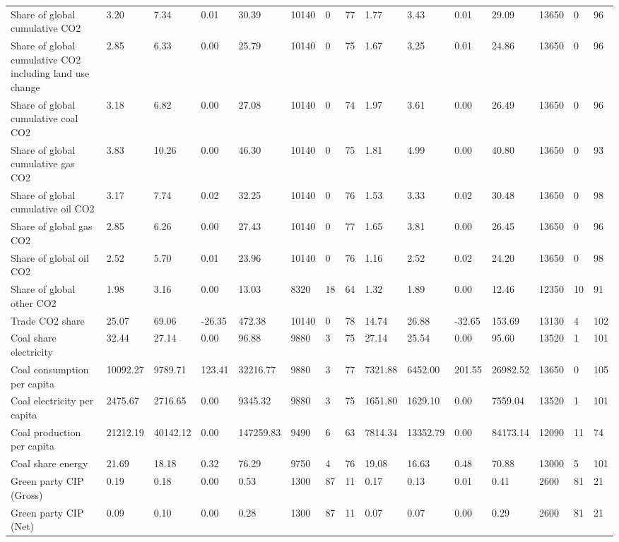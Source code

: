 \begin{longtable}{lllllllllllllll}
Share of global cumulative CO2 & 3.20 & 7.34 & 0.01 & 30.39 & 10140 & 0 & 77 & 1.77 & 3.43 & 0.01 & 29.09 & 13650 & 0 & 96\\
Share of global cumulative CO2 including land use change & 2.85 & 6.33 & 0.00 & 25.79 & 10140 & 0 & 75 & 1.67 & 3.25 & 0.01 & 24.86 & 13650 & 0 & 96\\
Share of global cumulative coal CO2 & 3.18 & 6.82 & 0.00 & 27.08 & 10140 & 0 & 74 & 1.97 & 3.61 & 0.00 & 26.49 & 13650 & 0 & 96\\
Share of global cumulative gas CO2 & 3.83 & 10.26 & 0.00 & 46.30 & 10140 & 0 & 75 & 1.81 & 4.99 & 0.00 & 40.80 & 13650 & 0 & 93\\
\addlinespace
Share of global cumulative oil CO2 & 3.17 & 7.74 & 0.02 & 32.25 & 10140 & 0 & 76 & 1.53 & 3.33 & 0.02 & 30.48 & 13650 & 0 & 98\\
Share of global gas CO2 & 2.85 & 6.26 & 0.00 & 27.43 & 10140 & 0 & 77 & 1.65 & 3.81 & 0.00 & 26.45 & 13650 & 0 & 96\\
Share of global oil CO2 & 2.52 & 5.70 & 0.01 & 23.96 & 10140 & 0 & 76 & 1.16 & 2.52 & 0.02 & 24.20 & 13650 & 0 & 98\\
Share of global other CO2 & 1.98 & 3.16 & 0.00 & 13.03 & 8320 & 18 & 64 & 1.32 & 1.89 & 0.00 & 12.46 & 12350 & 10 & 91\\
Trade CO2 share & 25.07 & 69.06 & -26.35 & 472.38 & 10140 & 0 & 78 & 14.74 & 26.88 & -32.65 & 153.69 & 13130 & 4 & 102\\
\addlinespace
Coal share electricity & 32.44 & 27.14 & 0.00 & 96.88 & 9880 & 3 & 75 & 27.14 & 25.54 & 0.00 & 95.60 & 13520 & 1 & 101\\
Coal consumption per capita & 10092.27 & 9789.71 & 123.41 & 32216.77 & 9880 & 3 & 77 & 7321.88 & 6452.00 & 201.55 & 26982.52 & 13650 & 0 & 105\\
Coal electricity per capita & 2475.67 & 2716.65 & 0.00 & 9345.32 & 9880 & 3 & 75 & 1651.80 & 1629.10 & 0.00 & 7559.04 & 13520 & 1 & 101\\
Coal production per capita & 21212.19 & 40142.12 & 0.00 & 147259.83 & 9490 & 6 & 63 & 7814.34 & 13352.79 & 0.00 & 84173.14 & 12090 & 11 & 74\\
Coal share energy & 21.69 & 18.18 & 0.32 & 76.29 & 9750 & 4 & 76 & 19.08 & 16.63 & 0.48 & 70.88 & 13000 & 5 & 101\\
\addlinespace
Green party CIP (Gross) & 0.19 & 0.18 & 0.00 & 0.53 & 1300 & 87 & 11 & 0.17 & 0.13 & 0.01 & 0.41 & 2600 & 81 & 21\\
Green party CIP (Net) & 0.09 & 0.10 & 0.00 & 0.28 & 1300 & 87 & 11 & 0.07 & 0.07 & 0.00 & 0.29 & 2600 & 81 & 21\\

\end{longtable}
